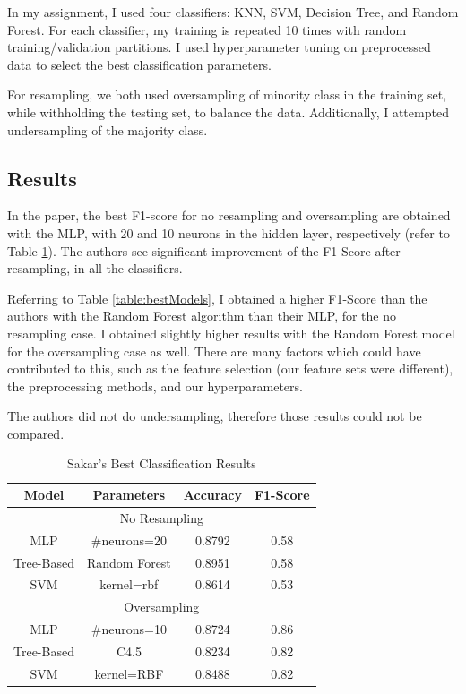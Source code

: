 \documentclass{article}
\begin{document}
In my assignment, I used four classifiers: KNN, SVM, Decision Tree, and Random Forest. For each classifier, my training is repeated 10 times with random training/validation partitions. I used hyperparameter tuning on preprocessed data to select the best classification parameters.

For resampling, we both used oversampling of minority class in the training set, while withholding the testing set, to balance the data. Additionally, I attempted undersampling of the majority class.

\subsection{Results}

In the paper, the best F1-score for no resampling and oversampling are obtained with the MLP, with 20 and 10 neurons in the hidden layer, respectively (refer to Table \ref{table:comparison}). The authors see significant improvement of the F1-Score after resampling, in all the classifiers. 

Referring to Table \ref{table:bestModels}, I obtained a higher F1-Score than the authors with the Random Forest algorithm than their MLP, for the no resampling case. I obtained slightly higher results with the Random Forest model for the oversampling case as well. There are many factors which could have contributed to this, such as the feature selection (our feature sets were different), the preprocessing methods, and our hyperparameters. 

The authors did not do undersampling, therefore those results could not be compared.

\begin{table}[H]
\centering
\begin{tabular}{| c | c || c | c |} 
\hline Model & Parameters & Accuracy & F1-Score \\
\hline \hline
 \multicolumn{4}{|c|}{No Resampling} \\ \hline
 MLP & \#neurons=20 & 0.8792 & \cellcolor{green!25}0.58 \\ \hline
 Tree-Based & Random Forest & \cellcolor{green!25}0.8951 & 0.58 \\ \hline
 SVM & kernel=rbf & 0.8614 & 0.53 \\ \hline
 \multicolumn{4}{|c|}{Oversampling} \\ \hline
 MLP & \#neurons=10 & \cellcolor{green!25}0.8724 & \cellcolor{green!25}0.86 \\ \hline
 Tree-Based & C4.5 & 0.8234 & 0.82 \\ \hline
 SVM & kernel=RBF & 0.8488 & 0.82 \\ \hline
\end{tabular}
\caption{Sakar's Best Classification Results\cite{sakar_polat_katircioglu_kastro_2018}}
\label{table:comparison}
\end{table}
\end{document}
